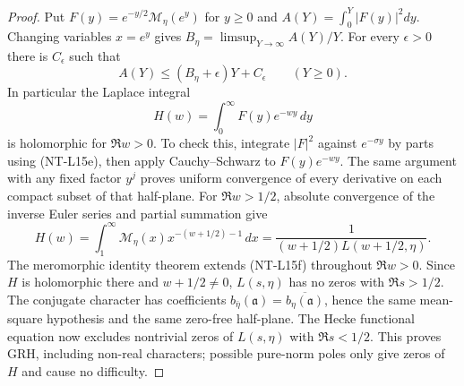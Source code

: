 \begin{proof}
Put $F(y)=e^{-y/2}\mathcal M_\eta(e^y)$ for $y\ge0$ and
$A(Y)=\int_0^Y|F(y)|^2dy$. Changing variables $x=e^y$ gives
$B_\eta=\limsup_{Y\to\infty}A(Y)/Y$.
For every $\epsilon>0$ there is $C_\epsilon$ such that
\[
 A(Y)\le (B_\eta+\epsilon)Y+C_\epsilon\qquad(Y\ge0).
                                                        \tag{NT-L15e}
\]
In particular the Laplace integral
\[
 H(w)=\int_0^\infty F(y)e^{-wy}\,dy
\]
is holomorphic for $\Re w>0$. To check this, integrate $|F|^2$ against
$e^{-\sigma y}$ by parts using (NT-L15e), then apply Cauchy--Schwarz to
$F(y)e^{-wy}$. The same argument with any fixed factor $y^j$ proves
uniform convergence of every derivative on each compact subset of that
half-plane. For $\Re w>1/2$, absolute convergence of the inverse Euler
series and partial summation give
\[
 H(w)=\int_1^\infty\mathcal M_\eta(x)x^{-(w+1/2)-1}\,dx
      =\frac1{(w+1/2)L(w+1/2,\eta)}.                    \tag{NT-L15f}
\]
The meromorphic identity theorem extends (NT-L15f) throughout $\Re w>0$.
Since $H$ is holomorphic there and $w+1/2\ne0$, $L(s,\eta)$ has no zeros
with $\Re s>1/2$. The conjugate character has coefficients
$b_{\bar\eta}(\mathfrak a)=\overline{b_\eta(\mathfrak a)}$, hence the
same mean-square hypothesis and the same zero-free half-plane.
The Hecke functional equation now excludes nontrivial zeros of
$L(s,\eta)$ with $\Re s<1/2$. This proves GRH, including non-real
characters; possible pure-norm poles only give zeros of $H$ and cause
no difficulty.


\end{proof}
